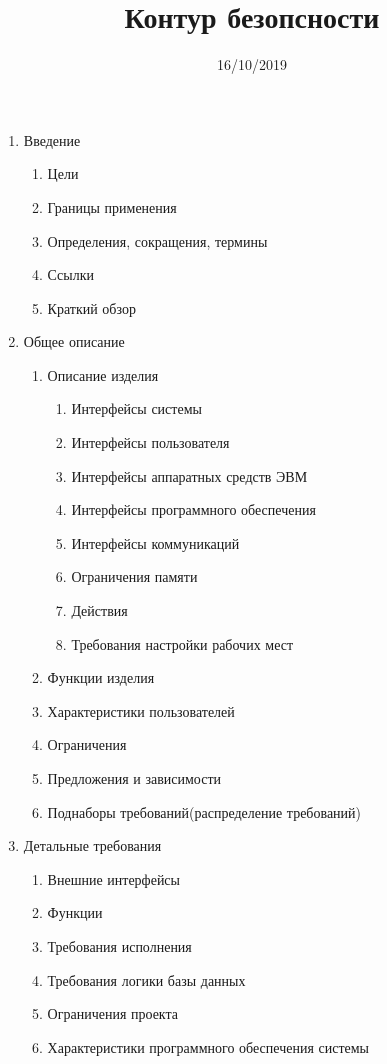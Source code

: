 \documentclass[12pt]{article} %
\title{Контур безопсности} %
\date{16/10/2019} %
\begin{document}
   \begin{enumerate} 
  \item Введение
    \begin{enumerate} 
        \item Цели
        \item Границы применения
        \item Определения, сокращения, термины
        \item Ссылки
        \item Краткий обзор
    \end{enumerate} 
  \item  Общее описание
  	\begin{enumerate}
  		\item Описание изделия
  			\begin{enumerate}
  				\item Интерфейсы системы
  				\item Интерфейсы пользователя
  				\item Интерфейсы аппаратных средств ЭВМ
  				\item Интерфейсы программного обеспечения
  				\item Интерфейсы коммуникаций
  				\item Ограничения памяти
  				\item Действия
  				\item Требования настройки рабочих мест
  			\end{enumerate}
  		\item Функции изделия
  		\item Характеристики пользователей
  		\item Ограничения
  		\item Предложения и зависимости
  		\item Поднаборы требований(распределение требований)
  	\end{enumerate}
  \item Детальные требования
  	\begin{enumerate}
  		\item Внешние интерфейсы
  		\item Функции
  		\item Требования исполнения
  		\item Требования логики базы данных
  		\item Ограничения проекта
  		\item Характеристики программного обеспечения системы
  			\begin{enumerate}

\end{enumerate}
\end{enumerate}
\end{enumerate}
\end{document}
